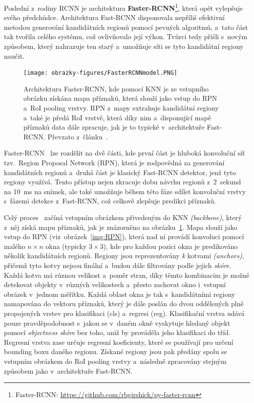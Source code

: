 Poslední z~rodiny RCNN je architektura \textbf{Faster-RCNN}\footnote{Faster-RCNN: \url{https://github.com/rbgirshick/py-faster-rcnn}}, která opět vylepšuje svého předchůdce. Architektura Fast-RCNN disponovala nepříliš efektivní metodou generování kandidátních regionů pomocí pevných algoritmů, a~tato část tak tvořila  celého systému, což ovlivňovalo její výkon. Tvůrci tedy přišli s~novým způsobem, který nahrazuje ten starý a~umožňuje síti se tyto kandidátní regiony naučit.

\begin{figure}[H]
	\centering
	\setlength{\fboxsep}{0pt}
	\texttt{[image: obrazky-figures/FasterRCNNmodel.PNG]}
	\caption{Architektura Faster-RCNN, kde pomocí KNN je ze vstupního obrázku získána mapa příznaků, která slouží jako vstup do RPN a~RoI pooling vrstvy. RPN z~mapy extrahuje kandidátní regiony a~také je předá RoI vrstvě, která díky nim a~disponující mapě příznaků data dále zpracuje, jak je to typické v~architektuře Fast-RCNN. Převzato z~článku~\cite{article:FasterRCNN}.}
	\label{img:FasterRCNNmodel}
\end{figure}

Faster-RCNN~\cite{website:FasterRCNN, article:FasterRCNN} lze rozdělit na dvě části, kde první část je hluboká konvoluční síť tzv.~Region Proposal Network (RPN), která je zodpovědná za generování kandidátních regionů a~druhá část je klasický Fast-RCNN detektor, jenž tyto regiony využívá. Tento přístup nejen zkracuje dobu návrhu regionů z~2~sekund na 10~ms na snímek, ale také umožňuje během této fáze sdílet konvoluční vrstvy s~fázemi detekce z~Fast-RCNN, což celkově zlepšuje predikci příznaků. 

Celý proces~\cite{website:FasterRCNN, article:FasterRCNN} začíná vstupním obrázkem přivedeným do KNN \emph{(backbone)}, který z~něj získá mapu příznaků, jak je znázorněno na obrázku~\ref{img:FasterRCNNmodel}.
Mapa slouží jako vstup do RPN (viz~obrázek~\ref{img:RPN}), která nad ní provádí konvoluci pomocí malého $n \times n$ okna (typicky $3 \times 3$), kde pro každou pozici okna je predikováno několik kandidátních regionů. Regiony jsou reprezentovány \emph{k} kotvami \emph{(anchors)}, přičemž tyto kotvy nejsou finální a~budou dále filtrovány podle jejich \emph{skóre}. Každá kotva má různou velikost a~poměr stran, díky těmto kombinacím je možné detekovat objekty v~různých velikostech a~přesto zachovat okno i~vstupní obrázek v~jednom měřítku. Každá oblast okna je tak s~kandidátními regiony namapována do vektoru příznaků, který je dále poslán do dvou oddělených plně propojených vrstev pro klasifikaci (cls) a~regresi (reg). Klasifikační vrstva udává pouze pravděpodobnost s~jakou se v~daném okně vyskytuje hledaný objekt pomocí \emph{objectness skóre} bez toho, aniž by prováděla jeho klasifikaci do tříd. Regresní vrstva zase určuje regresní koeficienty, které se používají pro určení bounding boxu daného regionu. Získané regiony jsou pak předány spolu se vstupním obrázkem do RoI pooling vrstvy a~následně zpracovány stejným způsobem jako v~architektuře Fast-RCNN.

